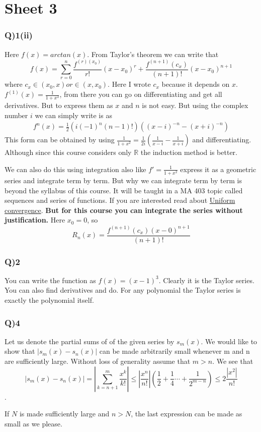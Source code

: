 \documentclass[11pt]{beamer}
\begin{document}
\section{Sheet 3}
\begin{frame}
\frametitle{Q)1(ii)}
Here $f(x)=arctan(x)$. From Taylor's theorem we can write that
$$f(x)=\sum_{r=0}^{n}\dfrac{f^{(r)(x_0)}}{r!}(x-x_0)^{r}+\dfrac{f^{(n+1)}(c_x)}{(n+1)!}(x-x_0)^{n+1}$$
where $c_x\in (x_0,x) or \in (x,x_0)$. Here I wrote $c_x$ because it depends on $x$. $f^{(1)}(x)=\frac{1}{1+x^2}$, from there you can go on differentiating and get all derivatives. But to express them as $x$ and $n$ is not easy. But using the complex number $i$ we can simply write is as
\begin{align*}
f^{n}(x)=\frac{1}{2}(i(-1)^{n}(n-1)!)((x-i)^{-n}-(x+i)^{-n})
\end{align*}
This form can be obtained by using $\frac{1}{1+x^2}=\frac{1}{2i}(\frac{1}{x-i}-\frac{1}{x+i})$ and differentiating. Although since this course considers only $\mathbb{R}$ the induction method is better.
\end{frame}
\begin{frame}
We can also do this using integration also like $f'=\frac{1}{1+x^2}$ express it as a geometric series and integrate term by term. But why we can integrate term by term is beyond the syllabus of this course. It will be taught in a MA 403 topic called sequences and series of functions. If you are interested read about \href{https://en.wikipedia.org/wiki/Uniform_convergence}{Uniform convergence}. \textbf{But for this course you can integrate the series without justification.} Here $x_0=0$, so
$$R_n(x)=\frac{f^{(n+1)}(c_x)(x-0)^{n+1}}{(n+1)!}$$
\end{frame}
\begin{frame}

\frametitle{Q)2}
You can write the function as $f(x)=(x-1)^3$. Clearly it is the Taylor series. You can also find derivatives and do. For any polynomial the Taylor series is exactly the polynomial itself.
\end{frame}
\begin{frame}
\frametitle{Q)4}
Let us denote the partial sums of of the given series by $s_m(x)$. We would like to show that $|s_m(x) - s_n(x)|$ can be made arbitrarily small whenever m and n are sufficiently large. Without loss of generality assume that $m>n$. We see that
$$|s_m(x) -s_n(x)|=|\sum_{k=n+1}^{m}\frac{x^k}{k!}|\leq |\frac{x^n}{n!}|\left(\frac{1}{2}+\frac{1}{4}\cdots +\frac{1}{2^{m-n}}\right)\leq 2\frac{|x^2|}{n!}$$.

If $N$ is made sufficiently large and $n > N$, the last expression can be made as small as we please.
\end{frame}
\end{document}
